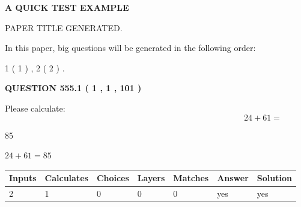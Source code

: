 \documentclass[12pt]{article}
\begin{document}
   
 \vspace{0.2in}
{\LARGE {\textbf{ A QUICK TEST EXAMPLE}}}
   
   
 PAPER TITLE GENERATED.
   
   
   
\vspace{0.2in}
   
In this paper, big questions will be generated in the following order: 
   
   
   1 ( 1 )
 ,
   2 ( 2 )
 .
  
\vspace{0.2in}
  
{\textbf{\Large{QUESTION
555.1 
 ( 1 , 1 , 101 )
}}}
  
  
 
Please calculate:
\begin{equation}
24 +  %
61 = \nonumber
\end{equation}
 
 
 
\noindent{}
 
 

85
 
 
\noindent{}
 
 

 
 
 
\noindent{}
 
 

$ %
24 +  %
61=   %
85$
 
 
\noindent{}
 
 

 
   
   
   
   
\noindent\begin{tabular}{|l|l|l|l|l|l|l|}
 \hline
Inputs & Calculates & Choices & Layers & Matches & Answer & Solution \\ \hline
 2  & 
 1  & 
 0
  & 
 0  & 
 0  & 
  yes & 
  yes 
  \\ \hline
 \end{tabular}
   
   
   
   
\noindent{}
   
\end{document}
